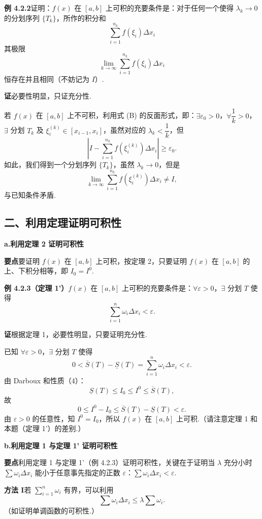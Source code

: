 \documentclass[UTF8,12pt,a4paper,fontset=fandol]{ctexart}
\begin{document}
\noindent\textbf{例 4.2.2}\quad 证明：$f(x)$ 在 $[a,b]$ 上可积的充要条件是：对于任何一个使得 $\lambda_k\to0$ 的分划序列 $\{T_k\}$，所作的积分和
\[
\sum_{i=1}^{n_k}f(\xi_i)\Delta x_i
\]
其极限
\[
\lim_{k\to\infty}\sum_{i=1}^{n_k}f(\xi_i)\Delta x_i
\]
恒存在并且相同（不妨记为 $I$）.

\noindent\textbf{证}\quad 必要性明显，只证充分性.

若 $f(x)$ 在 $[a,b]$ 上不可积，利用式 (B) 的反面形式，即：$\exists\varepsilon_0>0$，$\forall\dfrac1k>0$，$\exists$ 分划 $T_k$ 及 $\xi_i^{(k)}\in[x_{i-1},x_i]$，虽然对应的 $\lambda_k<\dfrac1k$，但
\[
\left|I-\sum_{i=1}^{n_k}f(\xi_i^{(k)})\Delta x_i\right|\ge\varepsilon_0.
\]
如此，我们得到一个分划序列 $\{T_k\}$，虽然 $\lambda_k\to0$，但是
\[
\lim_{k\to\infty}\sum_{i=1}^{n_k}f(\xi_i^{(k)})\Delta x_i\ne I,
\]
与已知条件矛盾.

\subsection*{二、利用定理证明可积性}

\noindent\textbf{a.\quad 利用定理 2 证明可积性}

\noindent\textbf{要点}\quad 要证明 $f(x)$ 在 $[a,b]$ 上可积，按定理 2，只要证明 $f(x)$ 在 $[a,b]$ 的上、下积分相等，即 $I_0=I^0$.

\noindent\textbf{例 4.2.3（定理 1'）}\quad $f(x)$ 在 $[a,b]$ 上可积的充要条件是：$\forall\varepsilon>0$，$\exists$ 分划 $T$ 使得
\[
\sum_{i=1}^n\omega_i\Delta x_i<\varepsilon.
\]

\noindent\textbf{证}\quad 根据定理 1，必要性明显，只要证明充分性.

已知 $\forall\varepsilon>0$，$\exists$ 分划 $T$ 使得
\[
0<\overline S(T)-\underline S(T)=\sum_{i=1}^n\omega_i\Delta x_i<\varepsilon.
\]
由 Darboux 和性质（4）：
\[
\underline S(T)\le I_0\le I^0\le\overline S(T),
\]
故
\[
0\le I^0-I_0\le\overline S(T)-\underline S(T)<\varepsilon.
\]
由 $\varepsilon>0$ 的任意性，知 $I^0=I_0$，所以 $f(x)$ 在 $[a,b]$ 上可积.（请注意定理 1 和本题（定理 1'）的差别.）

\noindent\textbf{b.\quad 利用定理 1 与定理 1' 证明可积性}

\noindent\textbf{要点}\quad 利用定理 1 与定理 1'（例 4.2.3）证明可积性，关键在于证明当 $\lambda$ 充分小时 $\sum\omega_i\Delta x_i$ 能小于任意事先指定的正数 $\varepsilon$：$\sum\omega_i\Delta x_i<\varepsilon$.

\noindent\textbf{方法 I}\quad 若 $\sum_{i=1}^n\omega_i$ 有界，可以利用
\[
\sum\omega_i\Delta x_i\le\lambda\sum\omega_i.
\]
（如证明单调函数的可积性.）
\end{document}
